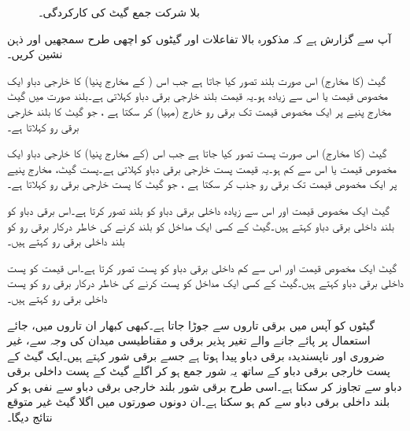 \begin{figure}
\centering
{}
\caption{بلا شرکت جمع گیٹ کی کارکردگی۔}
\label{شکل_بوولین_بلاشرکت_کارکردگی}
\end{figure}

آپ سے گزارش ہے کہ مذکورہ بالا تفاعلات اور گیٹوں کو اچھی طرح سمجھیں اور ذہن نشین کریں۔



گیٹ (کا مخارج) اس صورت بلند تصور کیا جاتا ہے جب اس ( کے مخارج پنیا) کا خارجی دباو ایک مخصوص قیمت یا اس سے زیادہ ہو۔یہ قیمت بلند خارجی برقی دباو  کہلاتی ہے۔بلند صورت میں گیٹ مخارج پنیے پر ایک مخصوص قیمت تک برقی رو خارج (مہیا) کر سکتا ہے ، جو گیٹ کا بلند خارجی برقی رو  کہلاتا ہے۔

گیٹ (کا مخارج) اس صورت پست تصور کیا جاتا ہے جب اس (کے مخارج پنیا) کا خارجی دباو ایک مخصوص قیمت یا اس سے کم ہو۔یہ قیمت پست خارجی برقی دباو  کہلاتی ہے۔پست گیٹ، مخارج پنیے پر ایک مخصوص قیمت تک برقی رو جذب کر سکتا ہے ، جو گیٹ کا پست خارجی برقی رو  کہلاتا ہے۔

	
گیٹ ایک مخصوص قیمت اور اس سے زیادہ داخلی برقی دباو کو بلند تصور کرتا ہے۔اس برقی دباو کو بلند داخلی برقی دباو  کہتے ہیں۔گیٹ کے کسی ایک مداخل کو بلند کرنے کی خاطر درکار برقی رو کو بلند داخلی برقی رو  کہتے ہیں۔

گیٹ ایک مخصوص قیمت اور اس سے کم داخلی برقی دباو کو پست تصور کرتا ہے۔اس قیمت کو پست داخلی برقی دباو  کہتے ہیں۔گیٹ کے کسی ایک مداخل کو پست کرنے کی خاطر درکار برقی رو کو پست داخلی برقی رو  کہتے ہیں۔
	
 گیٹوں کو آپس میں برقی تاروں سے جوڑا جاتا ہے۔کبھی کبھار ان تاروں میں، جائے استعمال پر پائے جانے والے تغیر پذیر برقی و مقناطیسی میدان کی وجہ سے، غیر ضروری اور ناپسندیدہ برقی دباو پیدا ہوتا ہے جسے برقی شور کہتے ہیں۔ایک گیٹ کے پست خارجی برقی دباو کے ساتھ یہ شور جمع ہو کر اگلے گیٹ کے پست داخلی برقی دباو سے تجاوز کر سکتا ہے۔اسی طرح برقی شور بلند خارجی برقی دباو سے نفی ہو کر بلند داخلی برقی دباو سے کم ہو سکتا ہے۔ان دونوں صورتوں میں اگلا گیٹ غیر متوقع نتائج دیگا۔

